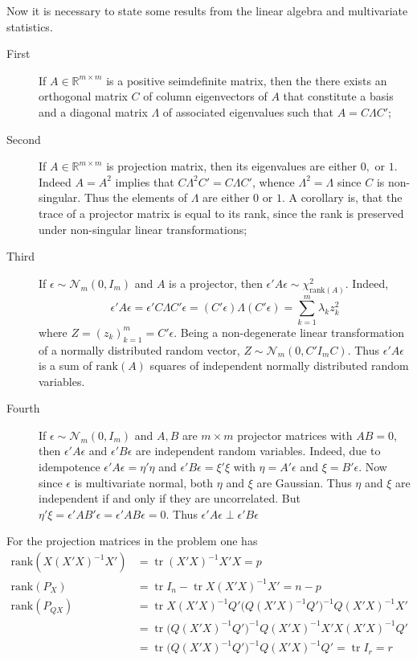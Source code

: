 \documentclass[a4paper]{article}
\newcommand{\Real}{\mathbb{R}}
\newcommand{\Tr}{\mathop{\text{tr}}\nolimits}
\begin{document}
\noindent Now it is necessary to state some results from the linear algebra and multivariate statistics.
\begin{description}
	\item[First] If $A\in \Real^{m\times m}$ is a positive seimdefinite matrix, then the there exists an orthogonal matrix $C$ of column eigenvectors of $A$ that constitute a basis and a diagonal matrix $\Lambda$ of associated eigenvalues such that $A = C\Lambda C'$;

	\item[Second] If $A\in \Real^{m\times m}$ is projection matrix, then its eigenvalues are either $0,$ or $1$. Indeed $A=A^2$ implies that $C\Lambda^2C' = C\Lambda C'$, whence $\Lambda^2 = \Lambda$ since $C$ is non-singular. Thus the elements of $\Lambda$ are either $0$ or $1$. A corollary is, that the trace of a projector matrix is equal to its rank, since the rank is preserved under non-singular linear transformations;

	\item[Third] If $\epsilon\sim\mathcal{N}_m(0,I_m)$ and $A$ is a projector, then $\epsilon'A\epsilon \sim \chi^2_{\text{rank}(A)}$.
	Indeed,
	\[\epsilon'A\epsilon = \epsilon'C\Lambda C'\epsilon = (C'\epsilon) \Lambda (C'\epsilon) = \sum_{k=1}^m \lambda_k z_k^2\]
	where $Z = (z_k)_{k=1}^m = C'\epsilon$. Being a non-degenerate linear transformation of a normally distributed random vector, $Z\sim\mathcal{N}_m(0, C'I_m C)$. Thus $\epsilon'A\epsilon$ is a sum of $\text{rank}(A)$ squares of independent normally distributed random variables.

	\item[Fourth] If $\epsilon\sim\mathcal{N}_m(0,I_m)$ and $A,B$ are $m\times m$ projector matrices with $A B = 0$, then $\epsilon'A\epsilon$ and $\epsilon'B\epsilon$ are independent random variables.
	Indeed, due to idempotence $\epsilon'A\epsilon = \eta'\eta$ and $\epsilon'B\epsilon = \xi'\xi$ with $\eta = A'\epsilon$ and $\xi = B'\epsilon$.
	Now since $\epsilon$ is multivariate normal, both $\eta$ and $\xi$ are Gaussian. Thus $\eta$ and $\xi$ are independent if and only if they are uncorrelated. But $\eta'\xi = \epsilon'AB'\epsilon = \epsilon'AB\epsilon = 0$. Thus $\epsilon'A\epsilon\perp \epsilon'B\epsilon$
\end{description}

\noindent For the projection matrices in the problem one has
\begin{align*}
	\text{rank} ( X(X'X)^{-1}X' ) &= \Tr (X'X)^{-1}X'X = p \\
	\text{rank} (P_X) &= \Tr I_n - \Tr X(X'X)^{-1}X' = n-p \\
	\text{rank} (P_{QX})
	&= \Tr X(X'X)^{-1}Q'\big(Q(X'X)^{-1}Q'\big)^{-1}Q(X'X)^{-1}X' \\
	&= \Tr \big(Q(X'X)^{-1}Q'\big)^{-1}Q(X'X)^{-1}X'X(X'X)^{-1}Q' \\
	&= \Tr \big(Q(X'X)^{-1}Q'\big)^{-1}Q(X'X)^{-1}Q' = \Tr I_r = r
\end{align*}
\end{document}
